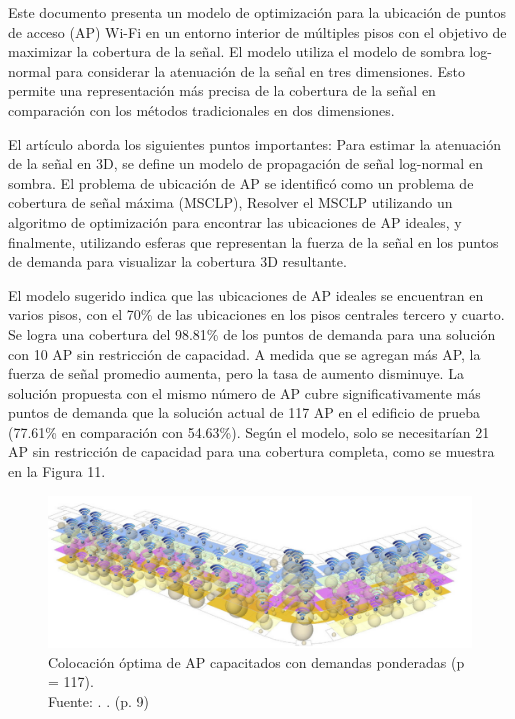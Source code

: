 Este documento presenta un modelo de optimización para la ubicación de puntos de acceso (AP) Wi-Fi en un entorno interior de múltiples pisos con el objetivo de maximizar la cobertura de la señal. El modelo utiliza el modelo de sombra log-normal para considerar la atenuación de la señal en tres dimensiones. Esto permite una representación más precisa de la cobertura de la señal en comparación con los métodos tradicionales en dos dimensiones.

El artículo aborda los siguientes puntos importantes: Para estimar la atenuación de la señal en 3D, se define un modelo de propagación de señal log-normal en sombra. El problema de ubicación de AP se identificó como un problema de cobertura de señal máxima (MSCLP), Resolver el MSCLP utilizando un algoritmo de optimización para encontrar las ubicaciones de AP ideales, y finalmente, utilizando esferas que representan la fuerza de la señal en los puntos de demanda para visualizar la cobertura 3D resultante.

El modelo sugerido indica que las ubicaciones de AP ideales se encuentran en varios pisos, con el 70\% de las ubicaciones en los pisos centrales tercero y cuarto. Se logra una cobertura del 98.81\% de los puntos de demanda para una solución con 10 AP sin restricción de capacidad. A medida que se agregan más AP, la fuerza de señal promedio aumenta, pero la tasa de aumento disminuye. La solución propuesta con el mismo número de AP cubre significativamente más puntos de demanda que la solución actual de 117 AP en el edificio de prueba (77.61\% en comparación con 54.63\%). Según el modelo, solo se necesitarían 21 AP sin restricción de capacidad para una cobertura completa, como se muestra en la Figura 11.

\begin{figure}[!ht]
	\begin{center}
		\includegraphics[width=1\textwidth]{2/figures/lee2015.png}
		\caption[Colocación óptima de AP capacitados con demandas ponderadas (p = 117)]{Colocación óptima de AP capacitados con demandas ponderadas (p = 117).\\
		Fuente: \cite{pr_lee2015coverage3d}. . (p. 9)}
		\label{2:fig119}
	\end{center}
\end{figure}

